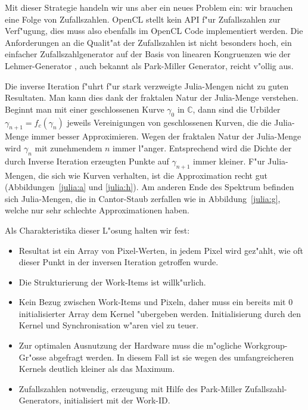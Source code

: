 \begin{refsection}
Mit dieser Strategie handeln wir uns aber ein neues Problem ein: wir brauchen
eine Folge von Zufallszahlen.
OpenCL stellt kein API f"ur Zufallszahlen zur Verf"ugung, dies muss also
ebenfalls im OpenCL Code implementiert werden.
Die Anforderungen an die Qualit"at der Zufallszahlen ist nicht besonders
hoch, ein einfacher Zufallszahlgenerator auf der Basis von linearen
Kongruenzen wie der Lehmer-Generator \cite{julia:lehmer},
auch bekannt als Park-Miller Generator, reicht v"ollig aus.

Die inverse Iteration f"uhrt f"ur stark verzweigte Julia-Mengen nicht
zu guten Resultaten.
Man kann dies dank der fraktalen Natur der Julia-Menge verstehen.
Beginnt man mit einer geschlossenen Kurve $\gamma_0$ in $\mathbb C$,
dann sind die Urbilder $\gamma_{n+1} = f_c(\gamma_n)$ jeweils Vereinigungen
von geschlossenen Kurven, die die Julia-Menge immer besser Approximieren.
Wegen der fraktalen Natur der Julia-Menge wird $\gamma_{n}$ mit zunehmendem
$n$ immer l"anger.
Entsprechend wird die Dichte der durch Inverse Iteration
erzeugten Punkte auf $\gamma_{n+1}$ immer kleiner. 
F"ur Julia-Mengen, die sich wie Kurven verhalten, ist die Approximation
recht gut (Abbildungen~\ref{julia:a} und \ref{julia:h}).
Am anderen Ende des Spektrum befinden sich Julia-Mengen, die in Cantor-Staub
zerfallen wie in Abbildung~\ref{julia:g}, welche nur sehr schlechte
Approximationen haben.

Als Charakteristika dieser L"osung halten wir fest:
\begin{itemize}
\item Resultat ist ein Array von Pixel-Werten, in jedem Pixel wird
gez"ahlt, wie oft dieser Punkt in der inversen Iteration getroffen wurde.
\item Die Strukturierung der Work-Items ist willk"urlich.
\item Kein Bezug zwischen Work-Items und Pixeln, daher muss ein bereits
mit 0 initialisierter Array dem Kernel "ubergeben werden.
Initialisierung durch den Kernel und Synchronisation w"aren viel zu teuer.
\item
Zur optimalen Ausnutzung der
Hardware muss die m"ogliche Workgroup-Gr"osse abgefragt werden.
In diesem Fall ist sie wegen des umfangreicheren
Kernels deutlich kleiner als das Maximum.
\item
Zufallszahlen notwendig, erzeugung mit Hilfe des Park-Miller
Zufallszahl-Generators, initialisiert mit der Work-ID.
\end{itemize}


\end{refsection}

